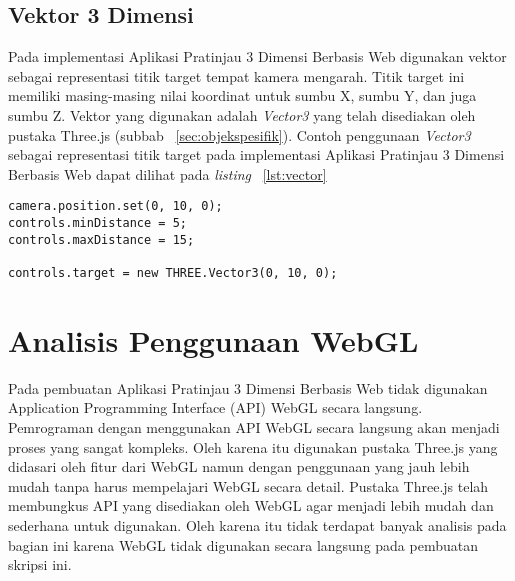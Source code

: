 \subsection{Vektor 3 Dimensi}
Pada implementasi Aplikasi Pratinjau 3 Dimensi Berbasis Web digunakan vektor sebagai representasi titik target tempat kamera mengarah. Titik target ini memiliki masing-masing nilai koordinat untuk sumbu X, sumbu Y, dan juga sumbu Z. Vektor yang digunakan adalah {\it Vector3} yang telah disediakan oleh pustaka Three.js (subbab ~\ref{sec:objekspesifik}). Contoh penggunaan {\it Vector3} sebagai representasi titik target pada implementasi Aplikasi Pratinjau 3 Dimensi Berbasis Web dapat dilihat pada {\it listing} ~\ref{lst:vector}
\begin{lstlisting}[caption={Contoh penggunaan {\it Vector3}}, label={lst:vector},captionpos=b]
camera.position.set(0, 10, 0);
controls.minDistance = 5;
controls.maxDistance = 15;

controls.target = new THREE.Vector3(0, 10, 0);
\end{lstlisting}

\section{Analisis Penggunaan WebGL}
Pada pembuatan Aplikasi Pratinjau 3 Dimensi Berbasis Web tidak digunakan Application Programming Interface (API) WebGL secara langsung. Pemrograman dengan menggunakan API WebGL secara langsung akan menjadi proses yang sangat kompleks. Oleh karena itu digunakan pustaka Three.js yang didasari oleh fitur dari WebGL namun dengan penggunaan yang jauh lebih mudah tanpa harus mempelajari WebGL secara detail. Pustaka Three.js telah membungkus API yang disediakan oleh WebGL agar menjadi lebih mudah dan sederhana untuk digunakan. Oleh karena itu tidak terdapat banyak analisis pada bagian ini karena WebGL tidak digunakan secara langsung pada pembuatan skripsi ini. 










